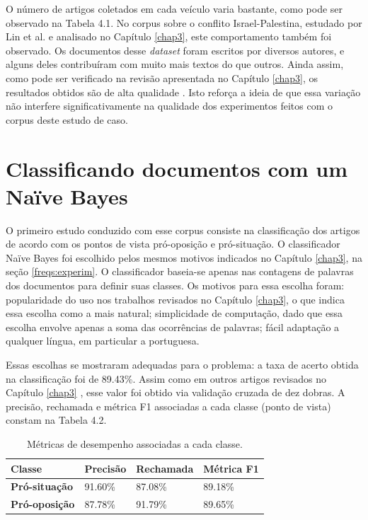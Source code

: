 O número de artigos coletados em cada veículo varia bastante, como pode ser observado na Tabela 4.1. No corpus sobre o conflito Israel-Palestina, estudado por Lin et al. e analisado no Capítulo \ref{chap3}, este comportamento também foi observado. Os documentos desse \emph{dataset} foram escritos por diversos autores, e alguns deles contribuíram com muito mais textos do que outros. Ainda assim, como pode ser verificado na revisão apresentada no Capítulo \ref{chap3}, os resultados obtidos são de alta qualidade \cite{lin-et-al2006}. Isto reforça a ideia de que essa variação não interfere significativamente na qualidade dos experimentos feitos com o corpus deste estudo de caso.


\section{Classificando documentos com um Naïve Bayes}
\label{estudo:sec2}

O primeiro estudo conduzido com esse corpus consiste na classificação dos artigos de acordo com os pontos de vista pró-oposição e pró-situação. O classificador Naïve Bayes foi escolhido pelos mesmos motivos indicados no Capítulo \ref{chap3}, na seção \ref{freqs:experim}. O classificador baseia-se apenas nas contagens de palavras dos documentos para definir suas classes. Os motivos para essa escolha foram: popularidade do uso nos trabalhos revisados no Capítulo \ref{chap3}, o que indica essa escolha como a mais natural; simplicidade de computação, dado que essa escolha envolve apenas a soma das ocorrências de palavras; fácil adaptação a qualquer língua, em particular a portuguesa. 


Essas escolhas se mostraram adequadas para o problema: a taxa de acerto obtida na classificação foi de 89.43\%. Assim como em outros artigos revisados no Capítulo \ref{chap3} \cite{lin-et-al2006} \cite{aaai-politics} \cite{klebanov}, esse valor foi obtido via validação cruzada de dez dobras. A precisão, rechamada e métrica F1 associadas a cada classe (ponto de vista) constam na Tabela 4.2. %


\begin{table}[h]
\centering
\begin{tabular}{| l | l | l | l | }
\hline

\textbf{Classe} & \textbf{Precisão} & \textbf{Rechamada} & \textbf{Métrica F1} \\ \hline

\textbf{Pró-situação} & 91.60\% & 87.08\% & 89.18\% \\ \hline
\textbf{Pró-oposição} & 87.78\% & 91.79\% & 89.65\% \\ \hline
\end{tabular}
\label{resultados}
\caption{Métricas de desempenho associadas a cada classe.}
\end{table}

